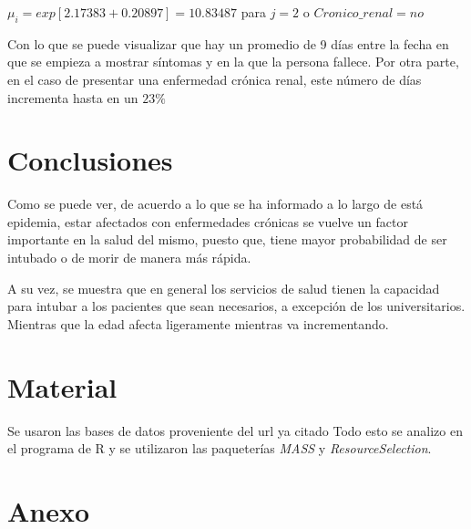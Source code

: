 \documentclass[12pt,a4paper,oneside]{article}
\begin{document}
$\mu_i = exp\left[2.17383 + 0.20897 \right] = 10.83487$ \hspace{2cm} para $j=2$ o $Cronico\_renal=no$

Con lo que se puede visualizar que hay un promedio de 9 días entre la fecha en que se empieza a mostrar síntomas y en la que la persona fallece. Por otra parte, en el caso de presentar una enfermedad crónica renal, este número de días incrementa hasta en un $23\%$

\section{Conclusiones}
Como se puede ver, de acuerdo a lo que se ha informado a lo largo de está epidemia, estar afectados con enfermedades crónicas se vuelve un factor importante en la salud del mismo, puesto que, tiene mayor probabilidad de ser intubado o de morir de manera más rápida.

A su vez, se muestra que en general los servicios de salud tienen la capacidad para intubar a los pacientes que sean necesarios, a excepción de los universitarios. Mientras que la edad afecta ligeramente mientras va incrementando.

\section{Material}
Se usaron las bases de datos proveniente del url ya citado
Todo esto se analizo en el programa de R y se utilizaron las paqueterías \textit{MASS} y \textit{ResourceSelection}.

\section{Anexo}
\end{document}
